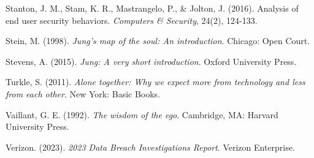 \documentclass[11pt,a4paper]{article}
\begin{document}
\begin{thebibliography}{99}
Stanton, J. M., Stam, K. R., Mastrangelo, P., \& Jolton, J. (2016). Analysis of end user security behaviors. \textit{Computers \& Security}, 24(2), 124-133.

Stein, M. (1998). \textit{Jung's map of the soul: An introduction}. Chicago: Open Court.

Stevens, A. (2015). \textit{Jung: A very short introduction}. Oxford University Press.

Turkle, S. (2011). \textit{Alone together: Why we expect more from technology and less from each other}. New York: Basic Books.

Vaillant, G. E. (1992). \textit{The wisdom of the ego}. Cambridge, MA: Harvard University Press.

Verizon. (2023). \textit{2023 Data Breach Investigations Report}. Verizon Enterprise.

\end{thebibliography}
\end{document}
